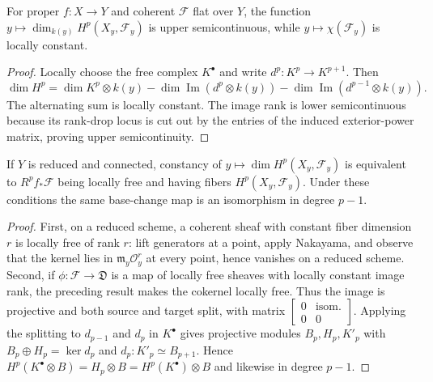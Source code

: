 \begin{corollary}
\label{mumford-thm-semicontinuity}
For proper $f:X\to Y$ and coherent $\mathcal F$ flat over $Y$, the function
$y\mapsto\dim_{k(y)}H^p(X_y,\mathcal F_y)$ is upper semicontinuous, while
$y\mapsto\chi(\mathcal F_y)$ is locally constant.
\end{corollary}
\begin{proof}
Locally choose the free complex $K^\bullet$ and write $d^p:K^p\to K^{p+1}$.
Then
\[
\dim H^p=\dim K^p\otimes k(y)-\dim\operatorname{Im}(d^p\otimes k(y))
 -\dim\operatorname{Im}(d^{p-1}\otimes k(y)).
\]
The alternating sum is locally constant. The image rank is lower
semicontinuous because its rank-drop locus is cut out by the entries of the
induced exterior-power matrix, proving upper semicontinuity.
\end{proof}

\begin{corollary}
\label{mumford-thm-base-change-criterion}
If $Y$ is reduced and connected, constancy of
$y\mapsto\dim H^p(X_y,\mathcal F_y)$ is equivalent to $R^pf_*\mathcal F$
being locally free and having fibers $H^p(X_y,\mathcal F_y)$. Under these
conditions the same base-change map is an isomorphism in degree $p-1$.
\end{corollary}
\begin{proof}
First, on a reduced scheme, a coherent sheaf with constant fiber dimension
$r$ is locally free of rank $r$: lift generators at a point, apply Nakayama,
and observe that the kernel lies in $\mathfrak m_y\mathcal O_y^r$ at every
point, hence vanishes on a reduced scheme. Second, if
$\phi:\mathscr F\to\mathfrak D$ is a map of locally free sheaves with
locally constant image rank, the preceding result makes the cokernel locally
free. Thus the image is projective and both source and target split, with
matrix $\left[\begin{smallmatrix}0&\text{isom.}\\0&0\end{smallmatrix}\right]$.
Applying the splitting to $d_{p-1}$ and $d_p$ in $K^\bullet$ gives projective
modules $B_p,H_p,K'_p$ with
$B_p\oplus H_p=\ker d_p$ and $d_p:K'_p\simeq B_{p+1}$. Hence
$H^p(K^\bullet\otimes B)=H_p\otimes B=H^p(K^\bullet)\otimes B$ and likewise
in degree $p-1$.
\end{proof}

